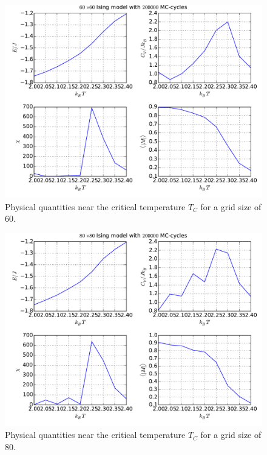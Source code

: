 \begin{figure}
  \centering
  \includegraphics[width=0.8\linewidth]{task_f_60.pdf}
  \caption{Physical quantities near the critical temperature $T_C$ for a grid size of 60.}
  \label{fig:task_f_60}
\end{figure}

\begin{figure}
  \centering
  \includegraphics[width=0.8\linewidth]{task_f_80.pdf}
  \caption{Physical quantities near the critical temperature $T_C$ for a grid size of 80.}
  \label{fig:task_f_80}
\end{figure}
